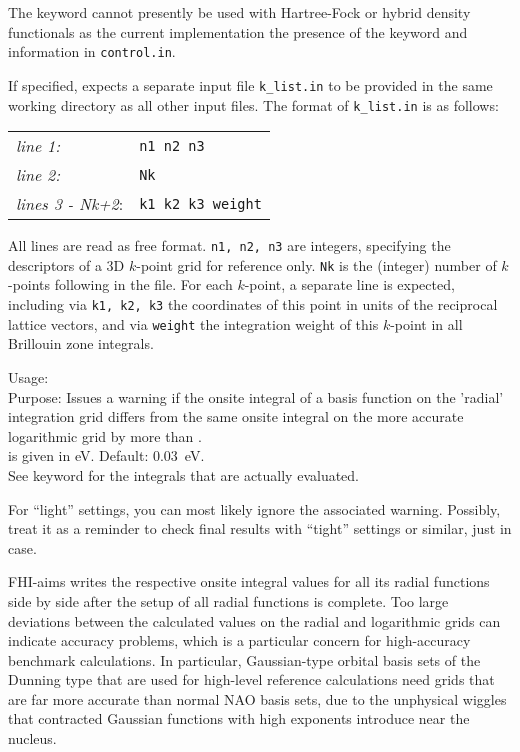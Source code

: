 The  keyword cannot presently be used with 
Hartree-Fock or hybrid density functionals
as the current implementation the presence of the
 keyword and information in \texttt{control.in}.

If specified,  expects a separate input
file \texttt{k\_list.in} to be provided in the same working directory
as all other input files. The format of \texttt{k\_list.in} is as
follows: \\[1.0ex] 
\begin{tabular}{ll}
\emph{line 1:} & \texttt{n1   n2   n3} \\
\emph{line 2:} & \texttt{Nk} \\
\emph{lines 3 - Nk+2}: & \texttt{k1   k2   k3   weight} \\
\end{tabular}

All lines are read as free format. \texttt{n1, n2, n3} are integers,
specifying the descriptors of a 3D $k$-point grid for reference
only. \texttt{Nk} is the (integer) number of $k$-points
following in the file. For each $k$-point, a separate line is
expected, including via \texttt{k1, k2, k3} the coordinates of this
point in units of the reciprocal lattice vectors, and via
\texttt{weight} the integration weight of this $k$-point in all
Brillouin zone integrals.

{
  \noindent
  Usage:   \\[1.0ex]
  Purpose: Issues a warning if the onsite integral of a basis function on 
    the 'radial' integration grid differs from the same onsite integral on
    the more accurate logarithmic grid by more than . \\[1.0ex]
   is given in eV. Default: 0.03~eV. \\
}
See keyword  
for the integrals that are actually evaluated.

For ``light'' settings, you can most likely ignore the associated warning. 
Possibly, treat it as a reminder to check final results with ``tight'' 
settings or similar, just in case.

FHI-aims writes the respective onsite integral values for all its
radial functions side by side after the setup of all radial functions
is complete. Too large deviations between the calculated values on the
radial and logarithmic grids can indicate accuracy problems, which is
a particular concern for high-accuracy benchmark calculations. In
particular, Gaussian-type orbital basis sets of the Dunning type that
are used for high-level reference calculations need grids that are far
more accurate than normal NAO basis sets, due to the unphysical
wiggles that contracted Gaussian functions with high exponents
introduce near the nucleus.

